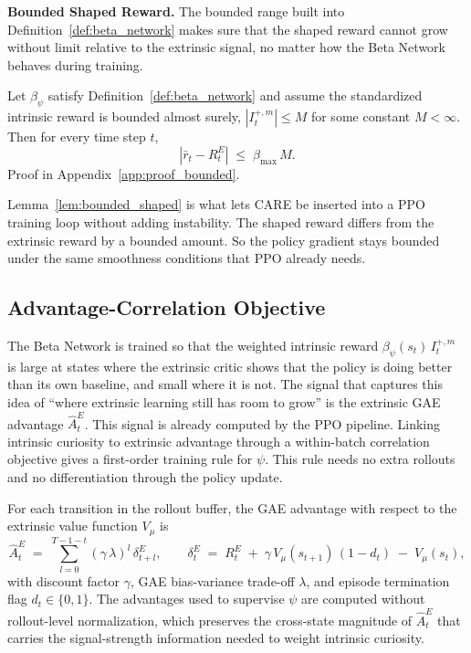 \textbf{Bounded Shaped Reward.} The bounded range built into Definition~\ref{def:beta_network} makes sure that the shaped reward cannot grow without limit relative to the extrinsic signal, no matter how the Beta Network behaves during training.

\begin{lemma}
\label{lem:bounded_shaped}
Let $\beta_\psi$ satisfy Definition~\ref{def:beta_network} and assume the standardized intrinsic reward is bounded almost surely, $|I_t^{+,m}| \le M$ for some constant $M < \infty$. Then for every time step $t$,
\begin{equation*}
\left| \bar{r}_t - R_t^E \right| \;\le\; \beta_\text{max}\, M.
\end{equation*}
Proof in Appendix~\ref{app:proof_bounded}.
\end{lemma}

Lemma~\ref{lem:bounded_shaped} is what lets CARE be inserted into a PPO training loop without adding instability. The shaped reward differs from the extrinsic reward by a bounded amount. So the policy gradient stays bounded under the same smoothness conditions that PPO already needs.

\subsection{Advantage-Correlation Objective}
\label{sec:progress_loss}

The Beta Network is trained so that the weighted intrinsic reward $\beta_\psi(s_t)\, I_t^{+,m}$ is large at states where the extrinsic critic shows that the policy is doing better than its own baseline, and small where it is not. The signal that captures this idea of ``where extrinsic learning still has room to grow'' is the extrinsic GAE advantage $\hat A_t^{E}$. This signal is already computed by the PPO pipeline. Linking intrinsic curiosity to extrinsic advantage through a within-batch correlation objective gives a first-order training rule for $\psi$. This rule needs no extra rollouts and no differentiation through the policy update.

For each transition in the rollout buffer, the GAE \cite{schulman2016gae} advantage with respect to the extrinsic value function $V_\mu$ is
\begin{equation}
\hat A_t^{E} \;=\; \sum_{l=0}^{T-1-t} (\gamma\,\lambda)^l\, \delta_{t+l}^{E},
\qquad
\delta_t^{E} \;=\; R_t^{E} \;+\; \gamma\, V_\mu(s_{t+1})\,(1 - d_t) \;-\; V_\mu(s_t),
\label{eq:gae_advantage_ext}
\end{equation}
with discount factor $\gamma$, GAE bias-variance trade-off $\lambda$, and episode termination flag $d_t \in \{0,1\}$. The advantages used to supervise $\psi$ are computed without rollout-level normalization, which preserves the cross-state magnitude of $\hat A_t^{E}$ that carries the signal-strength information needed to weight intrinsic curiosity.

